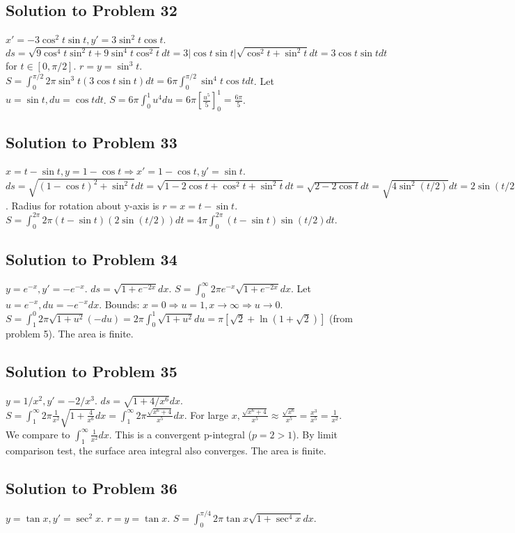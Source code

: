 \documentclass[12pt]{article}
\begin{document}
\subsection*{Solution to Problem 32}
$x'=-3\cos^2 t \sin t, y'=3\sin^2 t \cos t$. $ds=\sqrt{9\cos^4t\sin^2t+9\sin^4t\cos^2t}dt=3|\cos t\sin t|\sqrt{\cos^2t+\sin^2t}dt=3\cos t\sin t dt$ for $t\in[0,\pi/2]$.
$r=y=\sin^3 t$. $S=\int_0^{\pi/2} 2\pi \sin^3 t (3\cos t\sin t)dt=6\pi\int_0^{\pi/2} \sin^4 t \cos t dt$.
Let $u=\sin t, du=\cos t dt$. $S=6\pi\int_0^1 u^4 du=6\pi[\frac{u^5}{5}]_0^1 = \frac{6\pi}{5}$.

\subsection*{Solution to Problem 33}
$x=t-\sin t, y=1-\cos t \Rightarrow x'=1-\cos t, y'=\sin t$. $ds=\sqrt{(1-\cos t)^2+\sin^2t}dt=\sqrt{1-2\cos t+\cos^2t+\sin^2t}dt=\sqrt{2-2\cos t}dt=\sqrt{4\sin^2(t/2)}dt=2\sin(t/2)dt$.
Radius for rotation about y-axis is $r=x=t-\sin t$.
$S=\int_0^{2\pi} 2\pi(t-\sin t)(2\sin(t/2))dt = 4\pi\int_0^{2\pi}(t-\sin t)\sin(t/2)dt$.

\subsection*{Solution to Problem 34}
$y=e^{-x}, y'=-e^{-x}$. $ds=\sqrt{1+e^{-2x}}dx$. $S=\int_0^\infty 2\pi e^{-x}\sqrt{1+e^{-2x}}dx$.
Let $u=e^{-x}, du=-e^{-x}dx$. Bounds: $x=0\Rightarrow u=1, x\to\infty\Rightarrow u\to 0$.
$S=\int_1^0 2\pi\sqrt{1+u^2}(-du) = 2\pi\int_0^1 \sqrt{1+u^2}du = \pi[\sqrt{2}+\ln(1+\sqrt{2})]$ (from problem 5). The area is finite.

\subsection*{Solution to Problem 35}
$y=1/x^2, y'=-2/x^3$. $ds=\sqrt{1+4/x^6}dx$. $S=\int_1^\infty 2\pi \frac{1}{x^2}\sqrt{1+\frac{4}{x^6}}dx = \int_1^\infty 2\pi \frac{\sqrt{x^6+4}}{x^5}dx$.
For large $x, \frac{\sqrt{x^6+4}}{x^5} \approx \frac{\sqrt{x^6}}{x^5}=\frac{x^3}{x^5}=\frac{1}{x^2}$.
We compare to $\int_1^\infty \frac{1}{x^2}dx$. This is a convergent p-integral ($p=2>1$). By limit comparison test, the surface area integral also converges. The area is finite.

\subsection*{Solution to Problem 36}
$y=\tan x, y'=\sec^2 x$. $r=y=\tan x$.
$S=\int_0^{\pi/4} 2\pi \tan x \sqrt{1+\sec^4 x} dx$.
\end{document}
